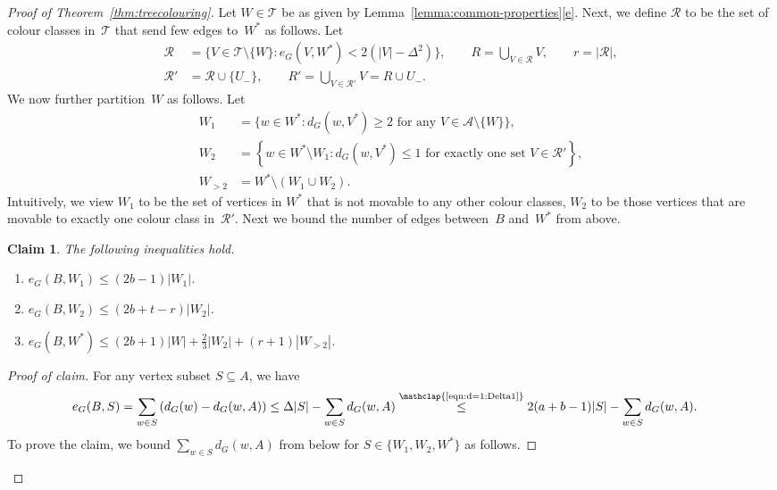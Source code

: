 \documentclass[11pt]{article}
\newenvironment{proofclaim}[1][Proof of claim]{\begin{proof}[#1]\renewcommand*{\qedsymbol}{\(\blacksquare\)}}{\end{proof}}
\theoremstyle{plain}
\newtheorem{claim}[thm]{Claim}
\numberwithin{equation}{section}
\begin{document}
\begin{proof}[Proof of Theorem~\ref{thm:treecolouring}]
Let $W \in \mathcal{T}$ be as given by Lemma~\ref{lemma:common-properties}\ref{e}.
Next, we define $\mathcal{R}$ to be the set of colour classes in~$\mathcal{T}$ that send few edges to~$W^*$ as follows.
Let
\begin{align*}
 \mathcal{R}&=\{V\in \mathcal{T}  \setminus \{W\} \colon  e_G(V, W^*) < 2(|V| -  \Delta^2) \}, \qquad
 R =\bigcup_{V\in \mathcal{R}} V, \qquad r =|\mathcal{R}|, \\
	\mathcal{R}' & = \mathcal{R} \cup \{U_-\}, \qquad R' =\bigcup_{V\in \mathcal{R}'} V = R \cup U_-.
\end{align*}
We now further partition~$W$ as follows.
Let
\begin{align*}
		W_1 &=\{w\in W^* \colon \text{$d_G(w,V^*) \ge 2 $ for any $V \in \mathcal{A} \setminus\{W\}$}\}, \\
  W_2 &=\left\{w \in W^* \setminus W_1 \colon d_G(w, V^*)\le 1 \text{ for exactly one set $V\in \mathcal{R}'$} \right\}, \\
		W_{>2} &= W^* \setminus  (W_1 \cup W_2).
\end{align*}
Intuitively, we view $W_1$ to be the set of vertices in $W^*$ that is not movable to any other colour classes, $W_2$ to be those vertices that are movable to exactly one colour class in~$\mathcal{R}'$.
Next we bound the number of edges between~$B$ and~$W^*$ from above.

\begin{claim}\label{claim:d=1upper}
The following inequalities hold.
\begin{enumerate}[label={\rm(\alph*)},start=1]
	\item $ e_G(B,W_1)  \le 	(2b-1)|W_1|$. \label{itm:d=1:e(B,W1)}
	\item $e_G(B,W_{2})   \le   (2b+t-r) |W_{2}|$. \label{itm:d=1:e(B,W2)}
	 \item $e_G(B,W^*)    \le (2b+1) |W|  +  \frac23|W_2|+(r+1)|W_{>2}|$. \label{itm:d=1:e(B,W3)}
\end{enumerate}
\end{claim}

\begin{proofclaim}
For any vertex subset $S \subseteq A$, we have
\begin{align}
	e_G(B,S) & = \sum_{w\in S} \left( d_G(w)- d_G(w,A) \right) \le \Delta |S| - 	\sum_{w\in S} d_G(w,A)
		\overset{\mathclap{\text{\eqref{eqn:d=1:Delta1}}}}{\le}
		2(a+b-1)|S|- 	\sum_{w\in S} d_G(w,A).
		\label{eqn:d=1:u1}
\end{align}
To prove the claim, we bound $\sum_{w \in S} d_G(w,A)$ from below for $S \in \{W_1,W_2, W^*\}$ as follows.


\end{proofclaim}
\end{proof}
\end{document}
